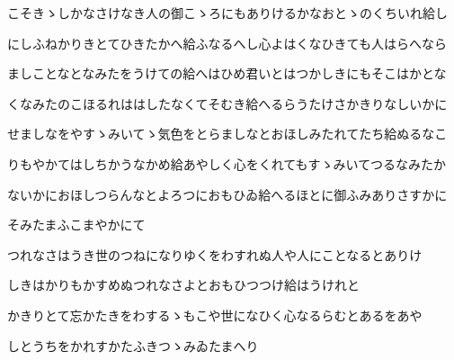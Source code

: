 \documentclass[a4paper,11pt,landscape]{ltjtarticle}
\begin{document}
\par\medskip
こそきゝしかなさけなき人の御こゝろにもありけるかなおとゝのくちいれ給し
\par\medskip
にしふねかりきとてひきたかへ給ふなるへし心よはくなひきても人はらへなら
\par\medskip
ましことなとなみたをうけての給へはひめ君いとはつかしきにもそこはかとな
\par\medskip
くなみたのこほるれははしたなくてそむき給へるらうたけさかきりなしいかに
\par\medskip
せましなをやすゝみいてゝ気色をとらましなとおほしみたれてたち給ぬるなこ
\par\medskip
りもやかてはしちかうなかめ給あやしく心をくれてもすゝみいてつるなみたか
\par\medskip
ないかにおほしつらんなとよろつにおもひゐ給へるほとに御ふみありさすかに
\par\medskip
そみたまふこまやかにて
\par\medskip
つれなさはうき世のつねになりゆくをわすれぬ人や人にことなるとありけ
\par\medskip
しきはかりもかすめぬつれなさよとおもひつつけ給はうけれと
\par\medskip
かきりとて忘かたきをわするゝもこや世になひく心なるらむとあるをあや
\par\medskip
しとうちをかれすかたふきつゝみゐたまへり
\par\medskip
\end{document}
